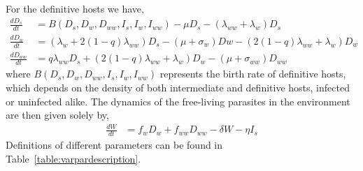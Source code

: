 \documentclass[11pt]{article}
\begin{document}
For the definitive hosts we have,
\begin{align}
\frac{dD_s}{dt} &= B(D_s,  D_w,  D_{ww},  I_s, I_w, I_{ww})  - \mu D_s - (\lambda_{ww} + \lambda_w) D_s \nonumber \\    
\frac{dD_w}{dt} &= (\lambda_w + 2 (1 - q) \lambda_{ww}) D_s - (\mu + \sigma_w) Dw - (2 (1 - q) \lambda_{ww} + \lambda_w) D_w  \label{odes:dhosts} \\         
\frac{dD_{ww}}{dt} &= q \lambda_{ww} D_s + (2 (1 - q) \lambda_{ww} + \lambda_w) D_w - (\mu + \sigma_{ww}) D_{ww} \nonumber
\end{align}
%
where $B(D_s, D_w, D_{ww}, I_s, I_w, I_{ww})$ represents the birth rate of definitive hosts, which depends on the density of both intermediate and definitive hosts, infected or uninfected alike. 
The dynamics of the free-living parasites in the environment are then given solely by,
\begin{align}
	\frac{dW}{dt} &= f_w D_w + f_{ww} D_{ww} - \delta W - \eta I_s \label{odes:eparasite}
\end{align}
%
Definitions of different parameters can be found in Table~\ref{table:varpardescription}.
%
\end{document}
